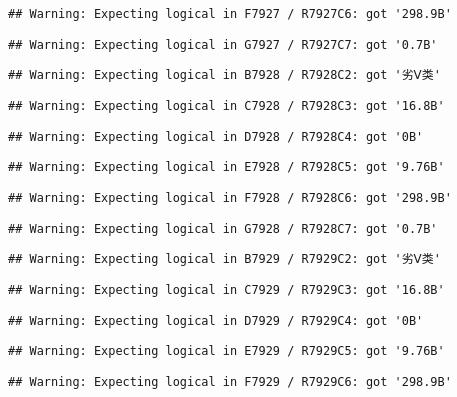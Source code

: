 \documentclass[
]{article}
\begin{document}
\begin{verbatim}
## Warning: Expecting logical in F7927 / R7927C6: got '298.9B'
\end{verbatim}

\begin{verbatim}
## Warning: Expecting logical in G7927 / R7927C7: got '0.7B'
\end{verbatim}

\begin{verbatim}
## Warning: Expecting logical in B7928 / R7928C2: got '劣Ⅴ类'
\end{verbatim}

\begin{verbatim}
## Warning: Expecting logical in C7928 / R7928C3: got '16.8B'
\end{verbatim}

\begin{verbatim}
## Warning: Expecting logical in D7928 / R7928C4: got '0B'
\end{verbatim}

\begin{verbatim}
## Warning: Expecting logical in E7928 / R7928C5: got '9.76B'
\end{verbatim}

\begin{verbatim}
## Warning: Expecting logical in F7928 / R7928C6: got '298.9B'
\end{verbatim}

\begin{verbatim}
## Warning: Expecting logical in G7928 / R7928C7: got '0.7B'
\end{verbatim}

\begin{verbatim}
## Warning: Expecting logical in B7929 / R7929C2: got '劣Ⅴ类'
\end{verbatim}

\begin{verbatim}
## Warning: Expecting logical in C7929 / R7929C3: got '16.8B'
\end{verbatim}

\begin{verbatim}
## Warning: Expecting logical in D7929 / R7929C4: got '0B'
\end{verbatim}

\begin{verbatim}
## Warning: Expecting logical in E7929 / R7929C5: got '9.76B'
\end{verbatim}

\begin{verbatim}
## Warning: Expecting logical in F7929 / R7929C6: got '298.9B'
\end{verbatim}
\end{document}
